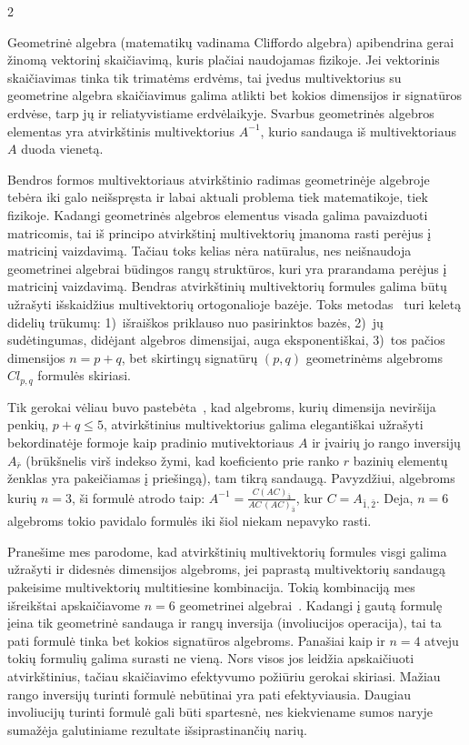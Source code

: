 \documentclass[a4paper,10pt,lithuanian]{article}
\begin{document}
\begin{multicols*}{2}

Geometrinė algebra (matematikų vadinama Cliffordo algebra)
apibendrina gerai žinomą vektorinį skaičiavimą, kuris plačiai naudojamas fizikoje. Jei vektorinis skaičiavimas tinka tik trimatėms erdvėms, tai įvedus multivektorius su geometrine algebra skaičiavimus galima atlikti bet kokios dimensijos ir signatūros erdvėse, tarp jų ir reliatyvistiame erdvėlaikyje. Svarbus geometrinės algebros elementas yra atvirkštinis multivektorius $A^{-1}$, kurio sandauga
iš multivektoriaus $A$ duoda vienetą.

Bendros formos multivektoriaus atvirkštinio radimas geometrinėje
algebroje tebėra iki galo neišspręsta ir labai aktuali problema
tiek matematikoje, tiek fizikoje. Kadangi geometrinės algebros
elementus visada galima pavaizduoti matricomis, tai iš principo
atvirkštinį multivektorių įmanoma rasti perėjus į matricinį
vaizdavimą. Tačiau toks kelias nėra natūralus, nes neišnaudoja
geometrinei algebrai būdingos rangų struktūros, kuri yra
prarandama perėjus į matricinį vaizdavimą. Bendras
atvirkštinių multivektorių formules galima būtų užrašyti
išskaidžius multivektorių ortogonalioje bazėje. Toks
metodas~\cite{key-1} turi keletą didelių trūkumų:
1)~išraiškos priklauso nuo pasirinktos bazės, 2)~jų
sudėtingumas, didėjant algebros dimensijai, auga
eksponentiškai, 3)~tos pačios dimensijos $n=p+q$, bet skirtingų
signatūrų $(p,q)$ geometrinėms algebroms $Cl_{p,q}$ formulės
skiriasi.

Tik gerokai vėliau buvo pastebėta~\cite{key-2}, kad algebroms,
kurių dimensija neviršija penkių,  $p+q\le 5$, atvirkštinius
multivektorius galima elegantiškai užrašyti bekordinatėje
formoje kaip pradinio mutivektoriaus $A$ ir įvairių jo rango
inversijų $A_{\bar r}$ (brūkšnelis virš indekso žymi, kad koeficiento prie
ranko $r$ bazinių elementų ženklas yra pakeičiamas į priešingą), tam tikrą sandaugą.
Pavyzdžiui,  algebroms kurių $n=3$,   ši formulė atrodo taip:
$A^{-1}=\frac{C(AC)_{\bar{3}}}{AC\,(AC)_{\bar{3}}}$, kur
$C=A_{\bar{1},\bar{2}}$. Deja, $n=6$ algebroms tokio pavidalo
formulės iki šiol niekam nepavyko rasti.

Pranešime mes parodome, kad atvirkštinių multivektorių
formules visgi galima užrašyti ir didesnės dimensijos
algebroms, jei paprastą multivektorių sandaugą
pakeisime  multivektorių multitiesine kombinacija. Tokią
kombinaciją mes išreikštai apskaičiavome $n=6$ geometrinei
algebrai~\cite{key-3}. Kadangi į gautą formulę įeina tik geometrinė sandauga
ir rangų inversija (involiucijos operacija), tai ta pati formulė
tinka bet kokios signatūros algebroms. Panašiai kaip ir $n=4$
atveju tokių formulių galima surasti ne vieną. Nors visos jos
leidžia apskaičiuoti atvirkštinius, tačiau skaičiavimo
efektyvumo požiūriu gerokai skiriasi. Mažiau rango
inversijų turinti formulė nebūtinai yra pati efektyviausia.
Daugiau involiucijų turinti formulė gali būti
spartesnė, nes kiekviename sumos naryje sumažėja galutiniame rezultate išsiprastinančių narių.


\end{multicols*}
\end{document}
